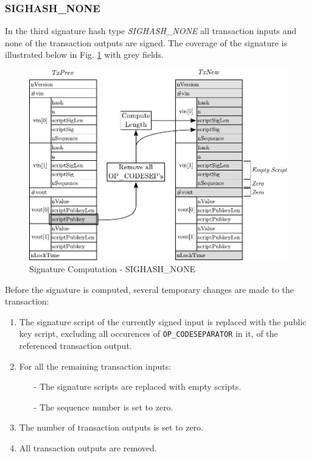 \clearpage
\subsubsection*{SIGHASH\_NONE}
In the third signature hash type \emph{SIGHASH\_NONE} all transaction inputs and none of the transaction outputs are signed. The coverage of the signature is illustrated below in Fig. \ref{fig:SigHash-None} with grey fields.

\begin{figure}[ht!]
 \centering
 \includegraphics[scale=0.9]{images/SIGHASH_NONE.pdf}
 \caption{Signature Computation - SIGHASH\_NONE} \label{fig:SigHash-None}
\end{figure}

\noindent
Before the signature is computed, several temporary changes are made to the transaction:
\begin{enumerate}[label=\alph*), leftmargin=1cm]
\item The signature script of the currently signed input is replaced with the public key script, excluding all occurences of \texttt{OP\_CODESEPARATOR} in it, of the referenced transaction output.
\item For all the remaining transaction inputs:\vspace{5pt}
\begin{itemize}
\item[-] The signature scripts are replaced with empty scripts.
\item[-] The sequence number is set to zero.
\end{itemize}
\item The number of transaction outputs is set to zero.
\item All transaction outputs are removed.
\end{enumerate}


